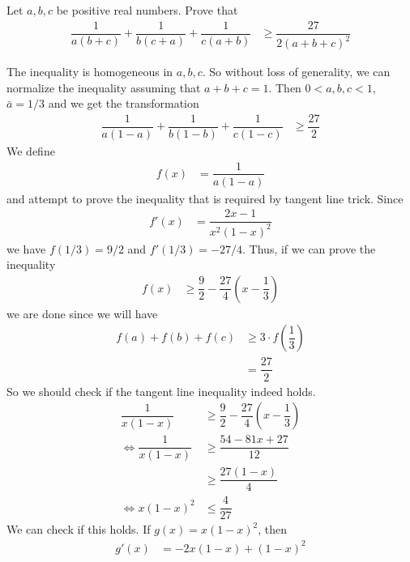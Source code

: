 \documentclass[inequalities.tex]{subfile}
\begin{document}
		\begin{problem}
			Let $a,b,c$ be positive real numbers. Prove that
				\begin{align*}
					\dfrac{1}{a(b+c)}+\dfrac{1}{b(c+a)}+\dfrac{1}{c(a+b)}
						& \geq \dfrac{27}{2(a+b+c)^{2}}
				\end{align*}
			
				\begin{solution}
					The inequality is homogeneous in $a,b,c$. So without loss of generality, we can normalize the inequality assuming that $a+b+c=1$. Then $0<a,b,c<1$, $\bar{a}=1/3$ and we get the transformation
						\begin{align*}
							\dfrac{1}{a(1-a)}+\dfrac{1}{b(1-b)}+\dfrac{1}{c(1-c)}
								& \geq \dfrac{27}{2}
						\end{align*}
					We define
						\begin{align*}
							f(x)
								& = \dfrac{1}{a(1-a)}
						\end{align*}
					and attempt to prove the inequality that is required by tangent line trick. Since
						\begin{align*}
							f'(x)
								& = \dfrac{2x-1}{x^{2}(1-x)^{2}}
						\end{align*}
					we have $f(1/3)=9/2$ and $f'(1/3)=-27/4$. Thus, if we can prove the inequality
						\begin{align*}
							f(x)
								& \geq \dfrac{9}{2}-\dfrac{27}{4}\left(x-\dfrac{1}{3}\right)
						\end{align*}
					we are done since we will have
						\begin{align*}
							f(a)+f(b)+f(c)
								& \geq 3\cdot f\left(\dfrac{1}{3}\right)\\
								& = \dfrac{27}{2}
						\end{align*}
					So we should check if the tangent line inequality indeed holds.
						\begin{align*}
							\dfrac{1}{x(1-x)}
								& \geq \dfrac{9}{2}-\dfrac{27}{4}\left(x-\dfrac{1}{3}\right)\\
							\iff \dfrac{1}{x(1-x)}
								& \geq \dfrac{54-81x+27}{12}\\
								& \geq \dfrac{27(1-x)}{4}\\
							\iff x(1-x)^{2}
								& \leq \dfrac{4}{27}
						\end{align*}
					We can check if this holds. If $g(x)=x(1-x)^{2}$, then
						\begin{align*}
							g'(x)
								& = -2x(1-x)+(1-x)^{2}\\

\end{align*}
\end{solution}
\end{problem}
\end{document}

